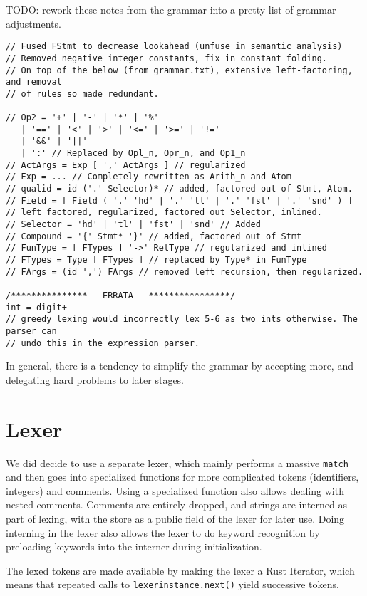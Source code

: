 \documentclass{report}
\begin{document}
TODO: rework these notes from the grammar into a pretty list of grammar
adjustments. 
\begin{verbatim}
// Fused FStmt to decrease lookahead (unfuse in semantic analysis)
// Removed negative integer constants, fix in constant folding.
// On top of the below (from grammar.txt), extensive left-factoring, and removal
// of rules so made redundant.

// Op2 = '+' | '-' | '*' | '%'
   | '==' | '<' | '>' | '<=' | '>=' | '!='
   | '&&' | '||'
   | ':' // Replaced by Opl_n, Opr_n, and Op1_n
// ActArgs = Exp [ ',' ActArgs ] // regularized
// Exp = ... // Completely rewritten as Arith_n and Atom
// qualid = id ('.' Selector)* // added, factored out of Stmt, Atom.
// Field = [ Field ( '.' 'hd' | '.' 'tl' | '.' 'fst' | '.' 'snd' ) ] 
// left factored, regularized, factored out Selector, inlined.
// Selector = 'hd' | 'tl' | 'fst' | 'snd' // Added
// Compound = '{' Stmt* '}' // added, factored out of Stmt
// FunType = [ FTypes ] '->' RetType // regularized and inlined
// FTypes = Type [ FTypes ] // replaced by Type* in FunType
// FArgs = (id ',') FArgs // removed left recursion, then regularized.

/***************   ERRATA   ****************/
int = digit+
// greedy lexing would incorrectly lex 5-6 as two ints otherwise. The parser can
// undo this in the expression parser.
\end{verbatim}

In general, there is a tendency to simplify the grammar by accepting more, and
delegating hard problems to later stages.

\section{Lexer}
We did decide to use a separate lexer, which mainly performs a massive
\texttt{match} and then goes into specialized functions for more complicated
tokens (identifiers, integers) and comments. Using a specialized function also
allows dealing with nested comments. Comments are entirely dropped, and strings
are interned as part of lexing, with the store as a public field of the lexer
for later use. Doing interning in the lexer also allows the lexer to do keyword
recognition by preloading keywords into the interner during initialization.

The lexed tokens are made available by making the lexer a Rust Iterator, which
means that repeated calls to \texttt{lexerinstance.next()} yield successive tokens.
\end{document}
